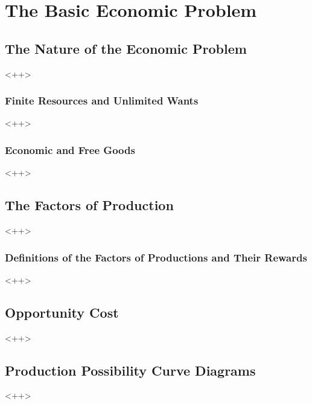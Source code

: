 \documentclass[11pt, a4paper]{report}
\begin{document}
\chapter{The Basic Economic Problem}

\section{The Nature of the Economic Problem}

<++>

\subsection{Finite Resources and Unlimited Wants}

<++>

\subsection{Economic and Free Goods}

<++>

\section{The Factors of Production}

<++>

\subsection{Definitions of the Factors of Productions and Their Rewards}

<++>

\section{Opportunity Cost}

<++>

\section{Production Possibility Curve Diagrams}

<++>
\end{document}
